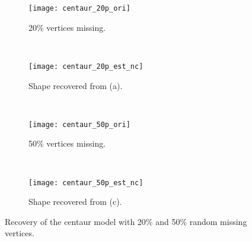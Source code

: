 \begin{figure}
  \centering
    \begin{subfigure}[b]{0.23\linewidth}
        \texttt{[image: centaur\_20p\_ori]}
        \caption{20\% vertices missing.}
    \end{subfigure}
    ~
    \begin{subfigure}[b]{0.23\linewidth}
        \texttt{[image: centaur\_20p\_est\_nc]}
        \caption{Shape recovered from (a).}
    \end{subfigure}
    ~
    \begin{subfigure}[b]{0.23\linewidth}
        \texttt{[image: centaur\_50p\_ori]}
        \caption{50\% vertices missing.}
    \end{subfigure}
    ~
    \begin{subfigure}[b]{0.23\linewidth}
        \texttt{[image: centaur\_50p\_est\_nc]}
        \caption{Shape recovered from (c).}
    \end{subfigure}
\caption{Recovery of the centaur model with 20\% and 50\% random missing vertices.}
\label{fig:centaur:recovery}
\end{figure}

